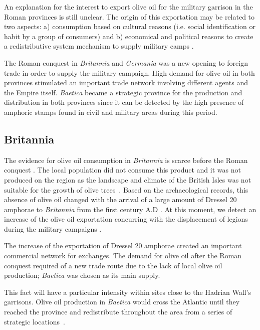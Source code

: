 An explanation for the interest to export olive oil for the military garrison in the Roman provinces is still unclear. The origin of this exportation may be related to two aspects: a) consumption based on cultural reasons (i.e. social identification or habit  by a group of consumers) and b) economical and political reasons to create a redistributive system mechanism to supply military camps \citep[69-70]{carreras_britannia_1998}. 

The Roman conquest in \textit{Britannia} and \textit{Germania} was a new opening to foreign trade in order to supply the military campaign. High demand for olive oil in both provinces stimulated an important trade network involving different agents and the Empire itself. \textit{Baetica} became a strategic province for the production and distribution in both provinces since it can be detected by the high presence of amphoric stamps found in civil and military areas during this period. 

\subsection{Britannia}
\label{sec:4}

The evidence for olive oil consumption in \textit{Britannia} is scarce before the Roman conquest \citep{funari_corpus_1996,carreras_abastecimiento_2003}. The local population did not consume this product and it was not produced on the region as the landscape and climate of the British Isles was not suitable for the growth of olive trees~\citep[161]{monfort_britanniaen_1998}. Based on the archaeological records, this absence of olive oil changed with the arrival of a large amount of Dressel 20 amphorae to \textit{Britannia} from the first century A.D \citep{peacock_amphorae_1991,
carreras_britannia_1998}. At this moment, we detect an increase of the olive oil exportation concurring with the displacement of legions during the military campaigns \citep[161]{monfort_britanniaen_1998}.

The increase of the exportation of Dressel 20 amphorae created an important commercial network for exchanges. The demand for olive oil after the Roman conquest required of a new trade route due to the lack of local olive oil production; \textit{Baetica} was chosen as its main supply.


This fact will have a particular intensity within sites close to the Hadrian Wall's garrisons. Olive oil production in \textit{Baetica} would cross the Atlantic until they reached the province and redistribute throughout the area from a series of strategic locations~\citep{carreras_atlantic_2012}. 


